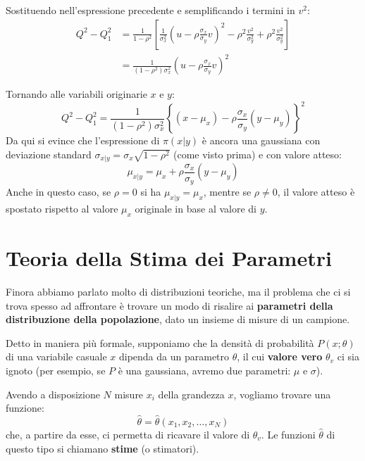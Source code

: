 \documentclass[openany,a4paper,12pt]{book}
\theoremstyle{remark}
\begin{document}
Sostituendo nell'espressione precedente e semplificando i termini in $v^2$:
\begin{align*}
Q^2 - Q_1^2 &= \frac{1}{1-\rho^2} \left[ \frac{1}{\sigma_x^2} \left( u - \rho\frac{\sigma_x}{\sigma_y}v \right)^2 - \rho^2\frac{v^2}{\sigma_y^2} + \rho^2\frac{v^2}{\sigma_y^2} \right] \\
&= \frac{1}{(1-\rho^2)\sigma_x^2} \left( u - \rho\frac{\sigma_x}{\sigma_y}v \right)^2
\end{align*}

Tornando alle variabili originarie $x$ e $y$:
\begin{equation}
Q^2 - Q_1^2 = \frac{1}{(1-\rho^2)\sigma_x^2} \left\{ \left(x-\mu_x\right) - \rho\frac{\sigma_x}{\sigma_y}(y-\mu_y) \right\}^2
\end{equation}
Da qui si evince che l'espressione di $\pi(x|y)$ è ancora una gaussiana con deviazione standard $\sigma_{x|y} = \sigma_x\sqrt{1-\rho^2}$ (come visto prima) e con valore atteso:
\begin{equation}
\mu_{x|y} = \mu_x + \rho\frac{\sigma_x}{\sigma_y}(y-\mu_y)
\end{equation}
Anche in questo caso, se $\rho = 0$ si ha $\mu_{x|y} = \mu_x$, mentre se $\rho \neq 0$, il valore atteso è spostato rispetto al valore $\mu_x$ originale in base al valore di $y$.


\section{Teoria della Stima dei Parametri}

Finora abbiamo parlato molto di distribuzioni teoriche, ma il problema che ci si trova spesso ad affrontare è trovare un modo di risalire ai \textbf{parametri della distribuzione della popolazione}, dato un insieme di misure di un campione.

Detto in maniera più formale, supponiamo che la densità di probabilità $P(x;\theta)$ di una variabile casuale $x$ dipenda da un parametro $\theta$, il cui \textbf{valore vero} $\theta_v$ ci sia ignoto (per esempio, se $P$ è una gaussiana, avremo due parametri: $\mu$ e $\sigma$).

Avendo a disposizione $N$ misure $x_i$ della grandezza $x$, vogliamo trovare una funzione:
\begin{equation*}
\hat{\theta} = \hat{\theta}(x_1, x_2, \dots, x_N)
\end{equation*}
che, a partire da esse, ci permetta di ricavare il valore di $\theta_v$. Le funzioni $\hat{\theta}$ di questo tipo si chiamano \textbf{stime} (o stimatori).
\end{document}
